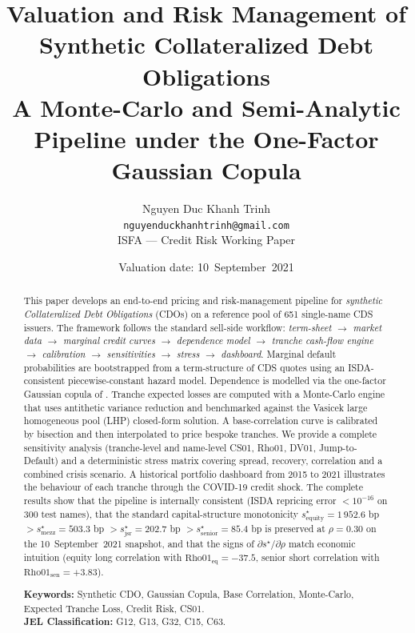\documentclass[11pt,a4paper]{article}
\title{\bfseries Valuation and Risk Management of Synthetic Collateralized Debt Obligations\\
       \large A Monte-Carlo and Semi-Analytic Pipeline under the One-Factor
       Gaussian Copula}
\author{Nguyen Duc Khanh Trinh\\
        \small \texttt{nguyenduckhanhtrinh@gmail.com}\\[2pt]
        \small ISFA --- Credit Risk Working Paper}
\date{Valuation date: 10~September~2021}
\newcommand{\1}{\mathbf{1}}
\begin{document}
\maketitle

\begin{abstract}
\noindent
This paper develops an end-to-end pricing and risk-management pipeline for
\emph{synthetic Collateralized Debt Obligations} (CDOs) on a reference pool
of 651 single-name CDS issuers. The framework follows the standard sell-side
workflow: \emph{term-sheet \(\rightarrow\) market data \(\rightarrow\)
marginal credit curves \(\rightarrow\) dependence model
\(\rightarrow\) tranche cash-flow engine \(\rightarrow\) calibration
\(\rightarrow\) sensitivities \(\rightarrow\) stress \(\rightarrow\) dashboard}.
Marginal default probabilities are bootstrapped from a term-structure of CDS
quotes using an ISDA-consistent piecewise-constant hazard model. Dependence
is modelled via the one-factor Gaussian copula of \citet{li2000,vasicek1987}.
Tranche expected losses are computed with a Monte-Carlo engine that uses
antithetic variance reduction and benchmarked against the Vasicek large
homogeneous pool (LHP) closed-form solution. A base-correlation curve is
calibrated by bisection and then interpolated to price bespoke tranches.
We provide a complete sensitivity analysis (tranche-level and name-level
CS01, Rho01, DV01, Jump-to-Default) and a deterministic stress matrix
covering spread, recovery, correlation and a combined crisis scenario.
A historical portfolio dashboard from 2015 to 2021 illustrates the behaviour
of each tranche through the COVID-19 credit shock. The complete results
show that the pipeline is internally consistent (ISDA repricing
error \(<10^{-16}\) on 300 test names), that the standard
capital-structure monotonicity
\(s^{\star}_{\text{equity}}=1\,952.6\) bp
\(>s^{\star}_{\text{mezz}}=503.3\) bp
\(>s^{\star}_{\text{jsr}}=202.7\) bp
\(>s^{\star}_{\text{senior}}=85.4\) bp
is preserved at \(\rho=0.30\) on the 10~September~2021 snapshot,
and that the signs of \(\partial s^{\star}/\partial\rho\) match
economic intuition (equity long correlation with
\(\mathrm{Rho01}_{\mathrm{eq}}=-37.5\), senior short correlation
with \(\mathrm{Rho01}_{\mathrm{sen}}=+3.83\)).\medskip

\noindent\textbf{Keywords:} Synthetic CDO, Gaussian Copula, Base Correlation,
Monte-Carlo, Expected Tranche Loss, Credit Risk, CS01.\\[2pt]
\textbf{JEL Classification:} G12, G13, G32, C15, C63.
\end{abstract}
\end{document}
